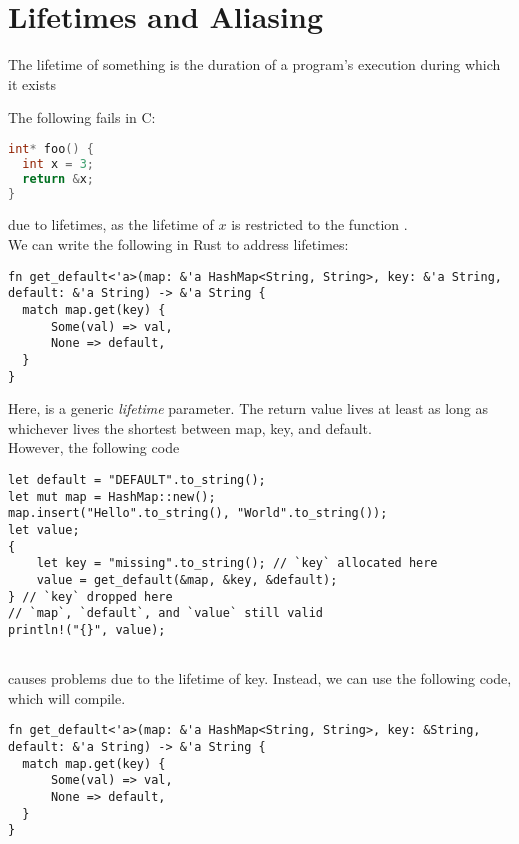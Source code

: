 \section{Lifetimes and Aliasing}

\begin{definition}[Lifetimes]
The lifetime of something is the duration of a program's execution during which it exists
\end{definition}

The following fails in C:
\begin{lstlisting}[language = C, frame = none]
int* foo() {
  int x = 3;
  return &x;
}
\end{lstlisting}

due to lifetimes, as the lifetime of $x$ is restricted to the function . \\

We can write the following in Rust to address lifetimes:
\begin{lstlisting}[frame = none]
fn get_default<'a>(map: &'a HashMap<String, String>, key: &'a String, default: &'a String) -> &'a String {
  match map.get(key) {
      Some(val) => val,
      None => default,
  }
}
\end{lstlisting}

Here,  is a generic \textit{lifetime} parameter.
The return value lives at least as long as whichever lives the shortest between map, key, and default. \\

However, the following code 
\begin{lstlisting}[frame = none]
let default = "DEFAULT".to_string();
let mut map = HashMap::new();
map.insert("Hello".to_string(), "World".to_string());
let value;
{
    let key = "missing".to_string(); // `key` allocated here
    value = get_default(&map, &key, &default);
} // `key` dropped here
// `map`, `default`, and `value` still valid
println!("{}", value);
  
\end{lstlisting}
causes problems due to the lifetime of key. Instead, we can use the following code, which will compile.

\begin{lstlisting}[frame = none]
fn get_default<'a>(map: &'a HashMap<String, String>, key: &String, default: &'a String) -> &'a String {
  match map.get(key) {
      Some(val) => val,
      None => default,
  }
}
\end{lstlisting}

